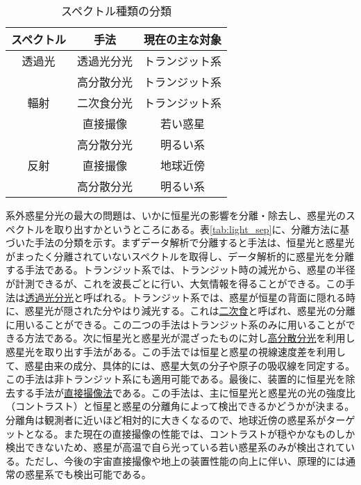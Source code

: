 \documentclass[xelatex,a4paper, twocolumn]{bxjsreport}
\begin{document}
\begin{table}[htbp]
\footnotesize
  \centering
  \caption{スペクトル種類の分類}
  \label{tab:spec_sep}
  \begin{tabular}{ccc}
    \hline
    スペクトル & 手法 & 現在の主な対象 \\
    \hline
    透過光 & 透過光分光 & トランジット系\\
                & 高分散分光 & トランジット系\\
    \hline
    輻射 & 二次食分光 & トランジット系\\
                & 直接撮像 & 若い惑星\\
                & 高分散分光 & 明るい系 \\
    \hline
    反射 & 直接撮像 & 地球近傍 \\ 
                & 高分散分光 & 明るい系 \\
  \end{tabular}
\end{table}




系外惑星分光の最大の問題は、いかに恒星光の影響を分離・除去し、惑星光のスペクトルを取り出すかというところにある。表\ref{tab:light_sep}に、分離方法に基づいた手法の分類を示す。まずデータ解析で分離すると手法は、恒星光と惑星光がまったく分離されていないスペクトルを取得し、データ解析的に惑星光を分離する手法である。トランジット系では、トランジット時の減光から、惑星の半径が計測できるが、これを波長ごとに行い、大気情報を得ることができる。この手法は\underline{透過光分光}と呼ばれる。トランジット系では、惑星が恒星の背面に隠れる時に、惑星光が隠された分やはり減光する。これは\underline{二次食}と呼ばれ、惑星光の分離に用いることができる。この二つの手法はトランジット系のみに用いることができる方法である。次に恒星光と惑星光が混ざったものに対し\underline{高分散分光}を利用し惑星光を取り出す手法がある。この手法では恒星と惑星の視線速度差を利用して、惑星由来の成分、具体的には、惑星大気の分子や原子の吸収線を同定する。この手法は非トランジット系にも適用可能である。最後に、装置的に恒星光を除去する手法が\underline{直接撮像法}である。この手法は、主に恒星光と惑星光の光の強度比（コントラスト）と恒星と惑星の分離角によって検出できるかどうかが決まる。分離角は観測者に近いほど相対的に大きくなるので、地球近傍の惑星系がターゲットとなる。また現在の直接撮像の性能では、コントラストが穏やかなものしか検出できないため、惑星が高温で自ら光っている若い惑星系のみが検出されている。ただし、今後の宇宙直接撮像や地上の装置性能の向上に伴い、原理的には通常の惑星系でも検出可能である。
\end{document}
